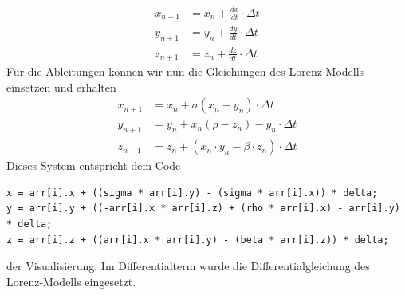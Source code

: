 \begin{align}
    x_{n + 1} &= x_n + \frac{dx}{dt} \cdot \Delta t\\
    y_{n + 1} &= y_n + \frac{dy}{dt} \cdot \Delta t\\
    z_{n + 1} &= z_n + \frac{dz}{dt} \cdot \Delta t
\end{align}
Für die Ableitungen können wir nun die Gleichungen des Lorenz-Modells einsetzen
und erhalten
\begin{align}
    x_{n + 1} &= x_n + \sigma(x_n - y_n) \cdot \Delta t\\
    y_{n + 1} &= y_n + x_n(\rho - z_n) - y_n \cdot \Delta t\\
    z_{n + 1} &= z_n + (x_n \cdot y_n - \beta \cdot z_n) \cdot \Delta t
\end{align}
Dieses System entspricht dem Code
\begin{lstlisting}[style=C]
x = arr[i].x + ((sigma * arr[i].y) - (sigma * arr[i].x)) * delta;
y = arr[i].y + ((-arr[i].x * arr[i].z) + (rho * arr[i].x) - arr[i].y) * delta;
z = arr[i].z + ((arr[i].x * arr[i].y) - (beta * arr[i].z)) * delta;
\end{lstlisting}
der Visualisierung. Im Differentialterm wurde die Differentialgleichung des Lorenz-Modells eingesetzt.
